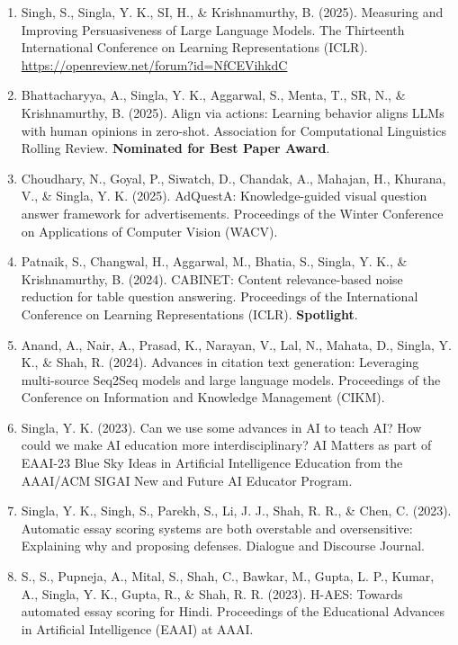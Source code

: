 \begin{enumerate}
    \item Singh, S., Singla, Y. K., SI, H., \& Krishnamurthy, B. (2025). Measuring and Improving Persuasiveness of Large Language Models. The Thirteenth International Conference on Learning Representations (ICLR). \url{https://openreview.net/forum?id=NfCEVihkdC}

    \item Bhattacharyya, A., Singla, Y. K., Aggarwal, S., Menta, T., SR, N., \& Krishnamurthy, B. (2025). Align via actions: Learning behavior aligns LLMs with human opinions in zero-shot. Association for Computational Linguistics Rolling Review. \textbf{Nominated for Best Paper Award}.

    \item Choudhary, N., Goyal, P., Siwatch, D., Chandak, A., Mahajan, H., Khurana, V., \& Singla, Y. K. (2025). AdQuestA: Knowledge-guided visual question answer framework for advertisements. Proceedings of the Winter Conference on Applications of Computer Vision (WACV).

    \item Patnaik, S., Changwal, H., Aggarwal, M., Bhatia, S., Singla, Y. K., \& Krishnamurthy, B. (2024). CABINET: Content relevance-based noise reduction for table question answering. Proceedings of the International Conference on Learning Representations (ICLR). \textbf{Spotlight}.

    \item Anand, A., Nair, A., Prasad, K., Narayan, V., Lal, N., Mahata, D., Singla, Y. K., \& Shah, R. (2024). Advances in citation text generation: Leveraging multi-source Seq2Seq models and large language models. Proceedings of the Conference on Information and Knowledge Management (CIKM).

    \item Singla, Y. K. (2023). Can we use some advances in AI to teach AI? How could we make AI education more interdisciplinary? AI Matters as part of EAAI-23 Blue Sky Ideas in Artificial Intelligence Education from the AAAI/ACM SIGAI New and Future AI Educator Program.

    \item Singla, Y. K., Singh, S., Parekh, S., Li, J. J., Shah, R. R., \& Chen, C. (2023). Automatic essay scoring systems are both overstable and oversensitive: Explaining why and proposing defenses. Dialogue and Discourse Journal.

    \item S., S., Pupneja, A., Mital, S., Shah, C., Bawkar, M., Gupta, L. P., Kumar, A., Singla, Y. K., Gupta, R., \& Shah, R. R. (2023). H-AES: Towards automated essay scoring for Hindi. Proceedings of the Educational Advances in Artificial Intelligence (EAAI) at AAAI.


\end{enumerate}
